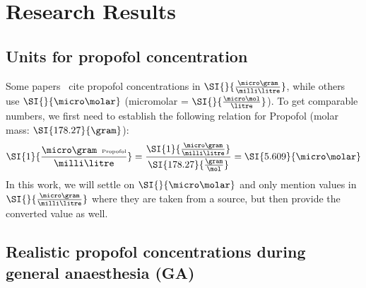 %
%
%
%
%

\section{Research Results}

\subsection{Units for propofol concentration}
Some papers~\cite{iwakiri_individual_2005} cite propofol concentrations in $\SI{}{\frac{\micro\gram}{\milli\litre}}$,
while others~\cite{kitamura_effects_2003, mcdougall_propofol_2008} use $\SI{}{\micro\molar}$ (micromolar =
$\SI{}{\frac{\micro\mol}{\litre}}$).
To get comparable numbers, we first need to establish the following relation for Propofol (molar mass: $\SI{178
.27}{\gram}$):
\[ \SI{1}{\frac{\micro\gram\hspace{0.5em}\text{\tiny{Propofol}}}{\milli\litre}}  =
\frac{ \SI{1}{\frac{\micro\gram}{\milli\litre}}}{\SI{178.27}{\frac{\gram}{\mol}}} = \SI{5.609}{\micro\molar} \]
In this work, we will settle on $\SI{}{\micro\molar}$
and only mention values in $\SI{}{\frac{\micro\gram}{\milli\litre}}$ where they are taken from a source,
but then provide the converted value as well.


\subsection{Realistic propofol concentrations during general anaesthesia (GA)}\label{subsec:realistic-prop-conc-during-ga}

